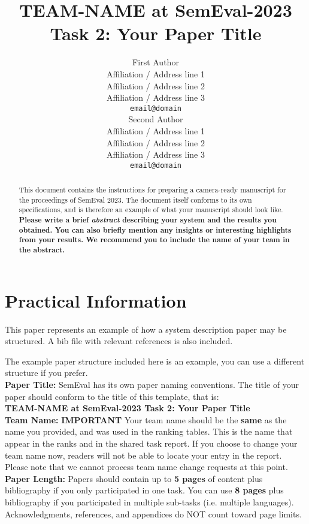 \documentclass[11pt]{article}
\title{TEAM-NAME at SemEval-2023 Task 2: Your Paper Title}
\author{First Author \\
  Affiliation / Address line 1 \\
  Affiliation / Address line 2 \\
  Affiliation / Address line 3 \\
  \texttt{email@domain} \\\And
  Second Author \\
  Affiliation / Address line 1 \\
  Affiliation / Address line 2 \\
  Affiliation / Address line 3 \\
  \texttt{email@domain} \\}
\begin{document}
\maketitle
\begin{abstract}
This document contains the instructions for preparing a camera-ready manuscript for the proceedings of SemEval 2023.
%
The document itself conforms to its own specifications, and is therefore an example of what your manuscript should look like.
%
\bf Please write a brief \emph{abstract} describing your system and the results you obtained. You can also briefly mention any insights or interesting highlights from your results. We recommend you to include the name of your team in the abstract.
\end{abstract}

\section*{Practical Information}

This paper represents an example of how a system description paper may be structured.
A bib file with relevant references is also included.

The example paper structure included here is an example, you can use a different structure if you prefer.\\

{\bf Paper Title:} SemEval has its own paper naming conventions. The title of your paper should conform to the title of this template, that is:\\

{\bf TEAM-NAME at SemEval-2023 Task 2: Your Paper Title} 
\\

{\bf Team Name:} {\bf IMPORTANT} Your team name should be the {\bf same} as the name you provided, and was used in the ranking tables. This is the name that appear in the ranks and in the shared task report. If you choose to change your team name now, readers will not be able to locate your entry in the report. Please note that we cannot process team name change requests at this point.
\\

{\bf Paper Length:} Papers should contain up to {\bf 5 pages} of content plus bibliography if you only participated in one task. You can use {\bf 8 pages}  plus bibliography if you participated in multiple sub-tasks (i.e. multiple languages). Acknowledgments, references, and appendices do NOT count toward page limits.
\end{document}
